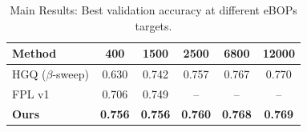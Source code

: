 \begin{table}[t]
\centering
\caption{Main Results: Best validation accuracy at different eBOPs targets.}
\label{tab:main_results}
\begin{tabular}{lccccc}
\toprule
Method & 400 & 1500 & 2500 & 6800 & 12000 \\
\midrule
HGQ ($\beta$-sweep) & 0.630 & 0.742 & 0.757 & 0.767 & 0.770 \\
FPL v1 & 0.706 & 0.749 & -- & -- & -- \\
\midrule
\textbf{Ours} & \textbf{0.756} & \textbf{0.756} & \textbf{0.760} & \textbf{0.768} & \textbf{0.769} \\
\bottomrule
\end{tabular}
\end{table}